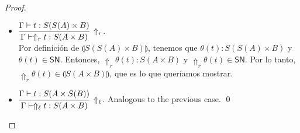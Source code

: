 \documentclass[preprint]{elsarticle}
\newcommand\interp[1]{\llparenthesis #1\rrparenthesis}
\newcommand\SN{\mathsf{SN}}
\begin{document}
\begin{proof}
\begin{itemize}
  \item $\vcenter{\infer[\Uparrow_r]{\Gamma \vdash \Uparrow_r t : S(A
        \times B)}{\Gamma \vdash t : S(S(A) \times B)}}$.
    \\ Por definición de \( \interp{S(S(A) \times B)} \), tenemos que \( \theta(t) : S(S(A) \times B) \) y \( \theta(t) \in \SN \). Entonces, \( \Uparrow_r \theta(t) : S(A \times B) \) y \( \Uparrow_r \theta(t) \in \SN \). Por lo tanto, \( \Uparrow_r \theta(t) \in \interp{S(A \times B)} \), que es lo que queríamos mostrar.

  \item $\vcenter{\infer[\Uparrow_\ell]{\Gamma \vdash \Uparrow_\ell t : S(A
        \times B)}{\Gamma \vdash t : S(A \times S(B))}}$.
    Analogous to the previous case. \qed
  \end{itemize}
\end{proof}
\end{document}
